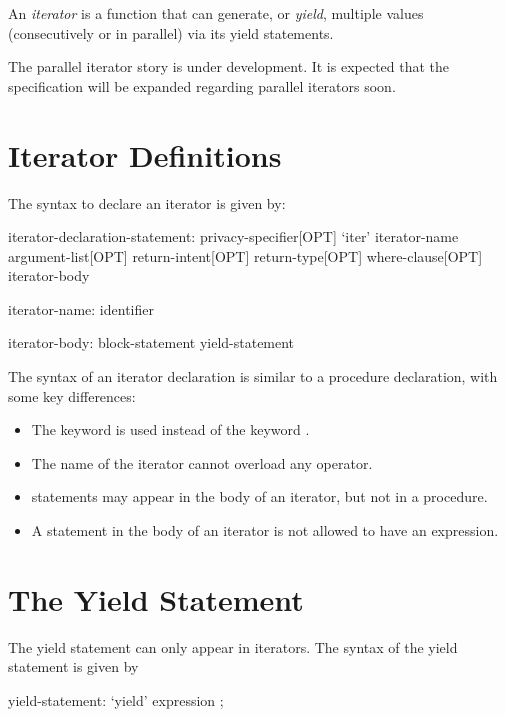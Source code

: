 \label{Iterators}

An \emph{iterator} is a function that can generate, or \emph{yield}, multiple values (consecutively or in parallel) via its yield statements.

\begin{openissue}
The parallel iterator story is under development.  It is expected that
the specification will be expanded regarding parallel iterators soon.
\end{openissue}

\section{Iterator Definitions}
\label{Iterator_Function_Definitions}

The syntax to declare an iterator is given
by:
\begin{syntax}
iterator-declaration-statement:
  privacy-specifier[OPT] `iter' iterator-name argument-list[OPT] return-intent[OPT] return-type[OPT] where-clause[OPT]
  iterator-body

iterator-name:
  identifier

iterator-body:
  block-statement
  yield-statement
\end{syntax}

The syntax of an iterator declaration is similar to a procedure declaration, with
some key differences:
\begin{itemize}
\item The keyword  is used instead of the keyword .
\item The name of the iterator cannot overload any operator.
\item {} statements may appear in the body of an iterator, but not in
a procedure.
\item A  statement in the body of an iterator is not allowed to have an expression.
\end{itemize}

\section{The Yield Statement}
\label{The_Yield_Statement}

The yield statement can only appear in iterators.  The syntax of the
yield statement is given by
\begin{syntax}
yield-statement:
  `yield' expression ;
\end{syntax}

